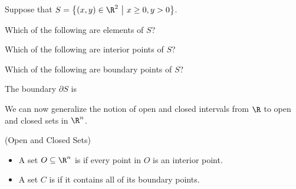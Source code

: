 \documentclass{ximera}
\begin{document}
\begin{question}
Suppose that $S = \left\{ (x,y) \in \R^2 ~ \big| ~ x \geq 0, y > 0\right\}$.

Which of the following are elements of $S$?
\begin{selectAll}
\end{selectAll}

Which of the following are interior points of $S$?
\begin{selectAll}
\end{selectAll}

Which of the following are boundary points of $S$?
\begin{selectAll}
\end{selectAll}

The boundary $\partial S $  is 
\end{question}

We can now generalize the notion of open and closed intervals from $\R$ to open and closed sets in $\R^n$.

\begin{definition} (Open and Closed Sets)

\begin{itemize}
  \item A set $O \subseteq \R^n$ is  if every point in $O$ is an interior
    point.
    \begin{image}
    \end{image}
  \item A set $C$ is  if it contains all of its boundary
    points.
    \begin{image}
    \end{image}
    
    
\end{itemize}
    
\end{definition}    
    
\end{document}

